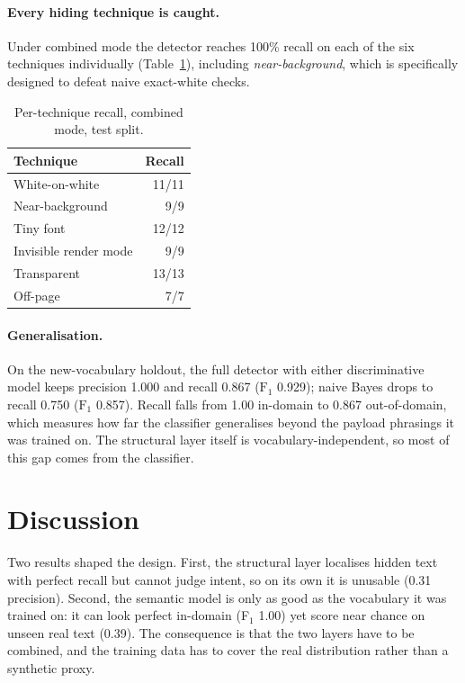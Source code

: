 \documentclass[11pt]{article}
\begin{document}
\paragraph{Every hiding technique is caught.}
Under combined mode the detector reaches 100\% recall on each of the six
techniques individually (Table~\ref{tab:pertech}), including
\emph{near-background}, which is specifically designed to defeat naive
exact-white checks.

\begin{table}[t]
  \centering
  \small
  \begin{tabular}{lr}
    \toprule
    \textbf{Technique} & \textbf{Recall} \\
    \midrule
    White-on-white & 11/11 \\
    Near-background & 9/9 \\
    Tiny font & 12/12 \\
    Invisible render mode & 9/9 \\
    Transparent & 13/13 \\
    Off-page & 7/7 \\
    \bottomrule
  \end{tabular}
  \caption{Per-technique recall, combined mode, test split.}
  \label{tab:pertech}
\end{table}

\paragraph{Generalisation.}
On the new-vocabulary holdout, the full detector with either discriminative
model keeps precision 1.000 and recall 0.867 ($\text{F}_1$ 0.929); naive Bayes
drops to recall 0.750 ($\text{F}_1$ 0.857). Recall falls from 1.00 in-domain to
0.867 out-of-domain, which measures how far the classifier generalises beyond
the payload phrasings it was trained on. The structural layer itself is
vocabulary-independent, so most of this gap comes from the classifier.

\section{Discussion}

Two results shaped the design. First, the structural layer localises hidden
text with perfect recall but cannot judge intent, so on its own it is unusable
(0.31 precision). Second, the semantic model is only as good as the vocabulary
it was trained on: it can look perfect in-domain (F$_1$ 1.00) yet score near
chance on unseen real text (0.39). The consequence is that the two layers have
to be combined, and the training data has to cover the real distribution rather
than a synthetic proxy.
\end{document}

